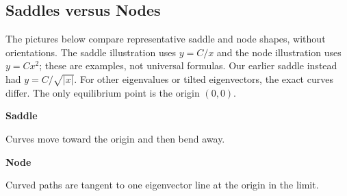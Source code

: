 \documentclass[10pt,letterpaper]{article}
\begin{document}
\subsection{Saddles versus Nodes}
The pictures below compare representative saddle and node shapes,
without orientations. The saddle illustration uses $y=C/x$ and the
node illustration uses $y=Cx^2$; these are examples, not universal
formulas. Our earlier saddle instead had $y=C/\sqrt{|x|}$.
For other eigenvalues or tilted eigenvectors, the exact curves differ. The only equilibrium point is the origin $(0,0)$.
\begin{center}
\begin{minipage}[t]{0.48\linewidth}
\centering
\textbf{Saddle}

\medskip
{}

\small
Curves move toward the origin and then bend away.
\end{minipage}
\hfill
\begin{minipage}[t]{0.48\linewidth}
\centering
\textbf{Node}

\medskip
{}

\small
Curved paths are tangent to one eigenvector line at the origin in the limit.
\end{minipage}
\end{center}
\end{document}
